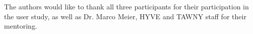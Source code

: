 \appendix


\begin{acks} %
  The authors would like to thank all three participants for their participation in the user study, as well as Dr. Marco Meier, HYVE and TAWNY staff for their mentoring.
\end{acks}